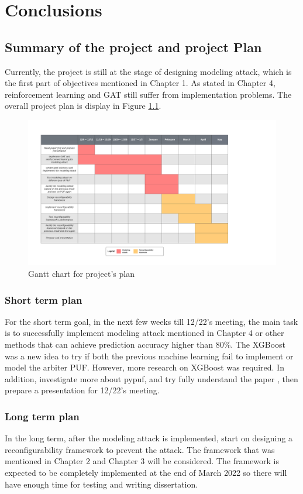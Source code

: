 \chapter{Conclusions}

\section{Summary of the project and project Plan}
Currently, the project is still at the stage of designing modeling attack, which is the first part of objectives mentioned in Chapter 1. As stated in Chapter 4, 
reinforcement learning and GAT still suffer from implementation problems. The overall project plan is display in Figure \ref{fig:figure13}.
\begin{figure}[htp]
    \centering
    \includegraphics[width=22cm]{figures/project_plan.png}
    \caption{Gantt chart for project's plan}
    \label{fig:figure13}
    \end{figure}

\subsection{Short term plan}
For the short term goal, in the next few weeks till 12/22's meeting,
the main task is to successfully implement modeling attack mentioned in Chapter 4 or other methods that can achieve prediction accuracy higher than 80\%. The XGBoost was a new idea to try if both the previous machine learning fail to implement or model the arbiter PUF. 
However, more research on XGBoost was required. In addition, investigate more about pypuf, and try fully understand the paper \cite{Reference11}, then prepare a presentation for 12/22's meeting.

\subsection{Long term plan}
In the long term, after the modeling attack is implemented, start on designing a reconfigurability framework to prevent the attack. The framework that was mentioned in Chapter 2 and Chapter 3 will be considered. The framework
is expected to be completely implemented at the end of March 2022 so there will have enough time for testing and writing dissertation.
